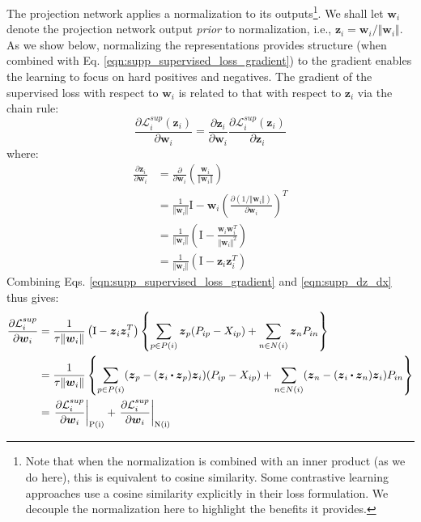 The projection network applies a normalization to its outputs\footnote{Note that when the normalization is combined with an inner product (as we do here), this is equivalent to cosine similarity. Some contrastive learning approaches \cite{chen2020simple} use a cosine similarity explicitly in their loss formulation. We decouple the normalization here to highlight the benefits it provides.%
}. We shall let $\boldsymbol{w}_i$ denote the projection network output \emph{prior} to normalization, i.e., $\boldsymbol{z}_i=\boldsymbol{w}_i/\Vert\boldsymbol{w}_i\Vert$. As we show below, normalizing the representations provides structure (when combined with Eq. \ref{eqn:supp_supervised_loss_gradient}) to the gradient enables the learning to focus on hard positives and negatives. The gradient of the supervised loss with respect to $\boldsymbol{w}_i$ is related to that with respect to $\boldsymbol{z}_i$ via the chain rule:
\begin{equation}
  \frac{\partial\mathcal{L}_i^{sup}(\boldsymbol{z}_i)}{\partial\boldsymbol{w}_i}=\frac{\partial\boldsymbol{z}_i}{\partial\boldsymbol{w}_i}\frac{\partial\mathcal{L}_i^{sup}(\boldsymbol{z}_i)}{\partial\boldsymbol{z}_i} \label{eqn:supp_gradient_chain_rule}
\end{equation}
where:
\begin{align}
  \frac{\partial\boldsymbol{z}_i}{\partial\boldsymbol{w}_i} & = \frac{\partial}{\partial\boldsymbol{w}_i}\left(\frac{\boldsymbol{w}_i}{\Vert\boldsymbol{w}_i\Vert}\right) \nonumber \\
  & = \frac{1}{\Vert\boldsymbol{w}_i\Vert}\text{I}-\boldsymbol{w}_i\left(\frac{\partial\left(1/\Vert\boldsymbol{w}_i\Vert\right)}{\partial\boldsymbol{w}_i}\right)^T \nonumber \\
  & = \frac{1}{\Vert\boldsymbol{w}_i\Vert}\left(\text{I}-\frac{\boldsymbol{w}_i\boldsymbol{w}_i^T}{\Vert\boldsymbol{w}_i\Vert^2}\right) \nonumber \\
  & = \frac{1}{\Vert\boldsymbol{w}_i\Vert}\left(\text{I}-\boldsymbol{z}_i\boldsymbol{z}_i^T\right)
  \label{eqn:supp_dz_dx}
\end{align}
Combining Eqs. \ref{eqn:supp_supervised_loss_gradient} and \ref{eqn:supp_dz_dx} thus gives:
\begin{align}
  \frac{\partial\mathcal{L}_i^{sup}}{\partial\boldsymbol{w}_i} & = \frac{1}{\tau\Vert\boldsymbol{w}_i\Vert}\left(\text{I}-\boldsymbol{z}_i\boldsymbol{z}_i^T\right)\left\{\sum_{p\in P(i)}\boldsymbol{z}_p(P_{ip}-X_{ip})+\sum_{n\in N(i)}\boldsymbol{z}_nP_{in}\right\}\nonumber\\
  & = \frac{1}{\tau\Vert\boldsymbol{w}_i\Vert}\left\{\sum_{p\in P(i)}(\boldsymbol{z}_p-(\boldsymbol{z}_i\bigcdot\boldsymbol{z}_p)\boldsymbol{z}_i)(P_{ip}-X_{ip})+\sum_{n\in N(i)}(\boldsymbol{z}_n-(\boldsymbol{z}_i\bigcdot\boldsymbol{z}_n)\boldsymbol{z}_i)P_{in}\right\}\nonumber\\
  & = \left.\frac{\partial\mathcal{L}_i^{sup}}{\partial\boldsymbol{w}_i}\right\vert_\text{P(i)}+\left.\frac{\partial\mathcal{L}_i^{sup}}{\partial\boldsymbol{w}_i}\right\vert_\text{N(i)}
\end{align}
